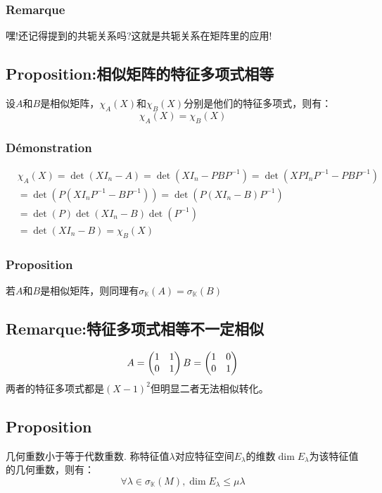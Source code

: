 \documentclass[12pt, a4paper, oneside]{ctexbook}
\begin{document}
  \subsubsection{Remarque}
  嘿!还记得提到的共轭关系吗?这就是共轭关系在矩阵里的应用!
  \subsection{Proposition:相似矩阵的特征多项式相等}
  设$A$和$B$是相似矩阵，$\chi_A(X)$和$\chi_B(X)$分别是他们的特征多项式，则有：
  $$
  \chi_A(X)=\chi_B(X)
  $$
  \subsubsection{Démonstration}
  $$
  \begin{aligned}
  &  \chi _A(X)=\det(XI_n-A)=\det(XI_n-PBP^{-1})=\det(XPI_nP^{-1}-PBP^{-1})\\
  &  =\det(P(XI_nP^{-1}-BP^{-1}))=\det(P(XI_n-B)P^{-1})\\
  &  =\det(P)\det(XI_n-B)\det(P^{-1})\\
  &  =\det(XI_n-B)=\chi _B(X)
    \end{aligned}
  $$
  \subsubsection{Proposition}
  若$A$和$B$是相似矩阵，则同理有$\sigma_{\mathbb{K}}(A)=\sigma_{\mathbb{K}}(B)$
  \subsection{Remarque:特征多项式相等不一定相似}
  
  \begin{equation}
    \notag
    A=\begin{pmatrix} 1 & 1 \\ 0 & 1 \end{pmatrix}
    B=\begin{pmatrix} 1 & 0 \\ 0 & 1 \end{pmatrix}
  \end{equation}
  两者的特征多项式都是$(X-1)^2$但明显二者无法相似转化。
  \subsection{Proposition}
  几何重数小于等于代数重数.
  称特征值$\lambda$对应特征空间$E_\lambda$的维数$\dim E_\lambda$为该特征值的几何重数，则有：
  $$
    \forall\lambda\in\sigma_{\mathbb{K}}(M), \dim E_\lambda\leq\mu\lambda
  $$
\end{document}
